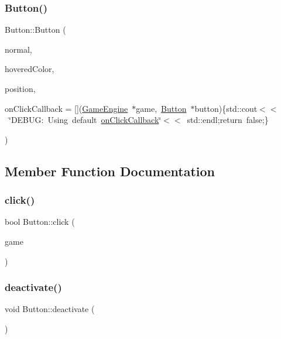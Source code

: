 \subsubsection{\texorpdfstring{Button()}{Button()}\hspace{0.1cm}{\footnotesize\ttfamily [2/2]}}
{\footnotesize\ttfamily Button\+::\+Button (\begin{DoxyParamCaption}\item[{sf\+::\+Texture $\ast$}]{normal,  }\item[{const sf\+::\+Color \&}]{hovered\+Color,  }\item[{const sf\+::\+Vector2f \&}]{position,  }\item[{bool($\ast$)(\mbox{\hyperlink{class_game_engine}{Game\+Engine}} $\ast$game, \mbox{\hyperlink{class_button}{Button}} $\ast$button)}]{on\+Click\+Callback = {\ttfamily \mbox{[}\mbox{]}(\mbox{\hyperlink{class_game_engine}{Game\+Engine}}~$\ast$game,~\mbox{\hyperlink{class_button}{Button}}~$\ast$button)\{std\+:\+:cout$<$$<$~\char`\"{}DEBUG\+:~Using~default~\mbox{\hyperlink{class_button_abd70dfccd5cce2eb6d4cae1d684107c3}{on\+Click\+Callback}}\char`\"{}$<$$<$~std\+:\+:endl;return~false;\}} }\end{DoxyParamCaption})}



\subsection{Member Function Documentation}
\mbox{\label{class_button_ac5e8ae25dcb8a33c6e8711ddbaed71bf}} 
\subsubsection{\texorpdfstring{click()}{click()}}
{\footnotesize\ttfamily bool Button\+::click (\begin{DoxyParamCaption}\item[{\mbox{\hyperlink{class_game_engine}{Game\+Engine}} $\ast$}]{game }\end{DoxyParamCaption})}

\mbox{\label{class_button_a57efb09b51a4846a25e7f61abee78cd6}} 
\subsubsection{\texorpdfstring{deactivate()}{deactivate()}}
{\footnotesize\ttfamily void Button\+::deactivate (\begin{DoxyParamCaption}{ }\end{DoxyParamCaption})\hspace{0.3cm}{\ttfamily [inline]}}

